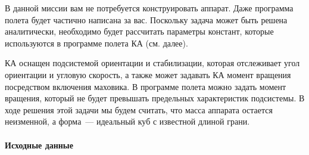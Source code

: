 \documentclass[12pt,a4paper]{article}
\begin{document}
В данной миссии вам не потребуется конструировать аппарат. Даже программа полета будет
частично написана за вас. Поскольку задача может быть решена аналитически, необходимо
будет рассчитать параметры констант, которые используются в программе полета КА
(см. далее).

КА оснащен подсистемой ориентации и стабилизации, которая отслеживает угол ориентации и
угловую скорость, а также может задавать КА момент вращения посредством включения
маховика. В программе полета можно задать момент вращения, который не будет превышать
предельных характеристик подсистемы. В ходе решения этой задачи мы будем считать, что
масса аппарата остается неизменной, а форма~--- идеальный куб с известной длиной грани.

\paragraph{Исходные данные}
\end{document}
